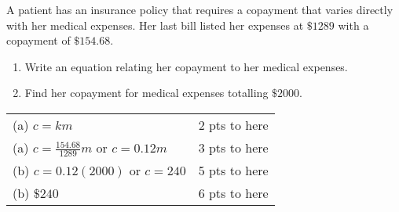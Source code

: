 
{
	A patient has an insurance policy that requires a copayment that varies directly with her medical expenses. Her last bill listed her expenses at $\$1289$ with a copayment of $\$154.68$.
	\begin{enumerate}
	\item Write an equation relating her copayment to her medical expenses.
	\item Find her copayment for medical expenses totalling $\$2000$.
	\end{enumerate}
}
{
	\begin{tabular}{l r}
	(a) $c = km$ & 2 pts to here\\
	(a) $c = \frac{154.68}{1289}m$ or $c = 0.12m$ & 3 pts to here\\
	(b) $c = 0.12(2000)$ or $c=240$ & 5 pts to here\\
	(b) $\$240$ & 6 pts to here
	\end{tabular}
}
